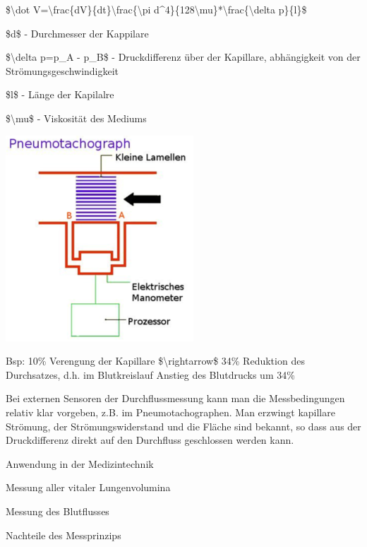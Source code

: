 \documentclass[a4paper]{article}
\begin{document}
\begin{multicols}{3}
\begin{itemize*}
    \begin{itemize*}
      \item \$\textbackslash dot V=\textbackslash frac\{dV\}\{dt\}\textbackslash frac\{\textbackslash pi d\^{}4\}\{128\textbackslash mu\}*\textbackslash frac\{\textbackslash delta p\}\{l\}\$
      \item \$d\$ - Durchmesser der Kappilare
      \item \$\textbackslash delta p=p\_A - p\_B\$ - Druckdifferenz über der Kapillare, abhängigkeit von der Strömungsgeschwindigkeit
      \item \$l\$ - Länge der Kapilalre
      \item \$\textbackslash mu\$ - Viskosität des Mediums
      \item \includegraphics[width=.5\linewidth]{Assets/Biosignalverarbeitung-pneumotachograph.png}
      \item Bsp: 10\% Verengung der Kapillare \$\textbackslash rightarrow\$ 34\% Reduktion des Durchsatzes, d.h. im Blutkreislauf Anstieg des Blutdrucks um 34\%
      \item Bei externen Sensoren der Durchflussmessung kann man die Messbedingungen relativ klar vorgeben, z.B. im Pneumotachographen. Man erzwingt kapillare Strömung, der Strömungswiderstand und die Fläche sind bekannt, so dass aus der Druckdifferenz direkt auf den Durchfluss geschlossen werden kann.
    \end{itemize*}
    \item Anwendung in der Medizintechnik
    \begin{itemize*}
      \item Messung aller vitaler Lungenvolumina
      \item Messung des Blutflusses
    \end{itemize*}
    \item Nachteile des Messprinzips

\end{itemize*}
\end{multicols}
\end{document}
